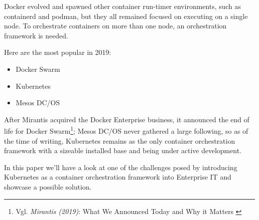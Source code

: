 Docker evolved and spawned other container run-timer environments, such as containerd and podman, but they all remained focused on executing on a single node. To orchestrate containers on more than one node, an orchestration framework is needed. 

Here are the most popular in 2019:
\begin{itemize}
\item Docker Swarm
\item Kubernetes
\item Mesos DC/OS
\end{itemize}

After Mirantis acquired the Docker Enterprise business, it announced the end of life for Docker Swarm\footnote{Vgl. \textit{Mirantis (2019)}: What We Announced Today and Why it Matters \cite{mirantisDocker}}; Mesos DC/OS never gathered a large following, so as of the time of writing, Kubernetes remains as the only container orchestration framework with a sizeable installed base and being under active development.

In this paper we'll have a look at one of the challenges posed by introducing Kubernetes as a container orchestration framework into Enterprise IT and showcase a possible solution.
